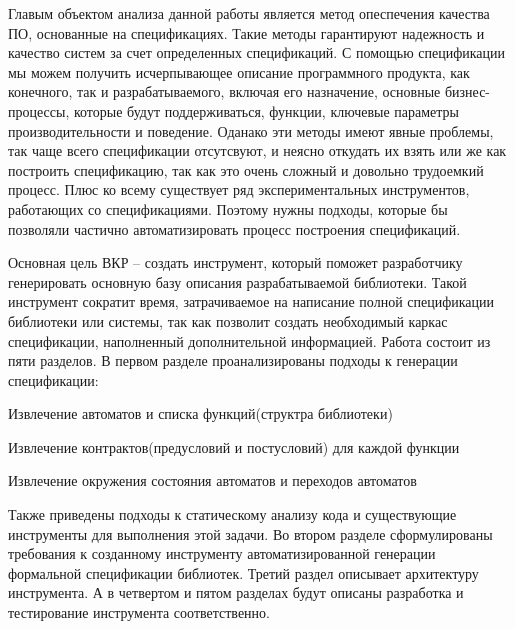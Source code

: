 Главым объектом анализа данной работы является метод опеспечения качества ПО, основанные на спецификациях.
Такие методы гарантируют надежность и качество систем за счет определенных спецификаций.
С помощью спецификации мы можем получить исчерпывающее описание программного продукта, как конечного, так и разрабатываемого, включая его назначение, основные бизнес-процессы, которые будут поддерживаться, функции, ключевые параметры производительности и поведение.
Оданако эти методы имеют явные проблемы, так чаще всего спецификации отсутсвуют, и неясно откудать их взять или же как построить спецификацию, так как это очень сложный и довольно трудоемкий процесс.
Плюс ко всему существует ряд экспериментальных инструментов, работающих со спецификациями.
Поэтому нужны подходы, которые бы позволяли частично автоматизировать процесс построения спецификаций.

Основная цель ВКР – создать инструмент, который поможет разработчику генерировать основную базу описания разрабатываемой библиотеки. Такой инструмент сократит время, затрачиваемое на написание полной спецификации библиотеки или системы, так как позволит создать необходимый каркас спецификации, наполненный дополнительной информацией.
Работа состоит из пяти разделов. В первом разделе проанализированы подходы к генерации спецификации:
%
\begin{itemize*}
\item Извлечение автоматов и списка функций(структра библиотеки)
\item Извлечение контрактов(предусловий и постусловий) для каждой функции
\item Извлечение окружения состояния автоматов и переходов автоматов
\end{itemize*}
%

Также приведены подходы к статическому анализу кода и существующие инструменты для выполнения этой задачи. Во втором разделе сформулированы требования к созданному инструменту автоматизированной генерации формальной спецификации библиотек. Третий раздел описывает архитектуру инструмента. А в четвертом и пятом разделах будут описаны разработка и тестирование инструмента соответственно.
